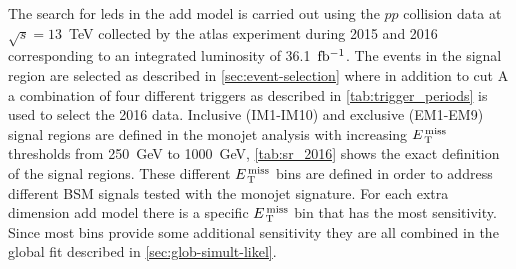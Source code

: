 The search for \glspl{led} in the \gls{add} model is carried out using the $pp$
collision data at $\sqrt{s} = 13$~TeV collected by the \gls{atlas} experiment
during 2015 and 2016 corresponding to an integrated luminosity of
36.1~$\mbox{fb$^{-1}$}$. The events in the signal region are selected as described in
\cref{sec:event-selection} where in addition to cut A a combination of four
different triggers as described in \cref{tab:trigger_periods} is used to select
the 2016 data. Inclusive (IM1-IM10) and exclusive (EM1-EM9) signal regions are
defined in the monojet analysis with increasing $E_\mathrm{\, T}^\mathrm{\, miss}$ thresholds from 250~GeV
to 1000~GeV, \cref{tab:sr_2016} shows the exact definition of the signal
regions. These different $E_\mathrm{\, T}^\mathrm{\, miss}$ bins are defined in order to address different
BSM signals tested with the monojet signature. For each extra dimension
\gls{add} model there is a specific $E_\mathrm{\, T}^\mathrm{\, miss}$ bin that has the most
sensitivity. Since most bins provide some additional sensitivity they are all
combined in the global fit described in \cref{sec:glob-simult-likel}.
\begin{table}[!htb]
  \centering
  \caption{Definition of the signal regions for the search for \gls{add}
    gravitons in the 2015 and 2016 data.}
  \label{tab:sr_2016}
\end{table}
